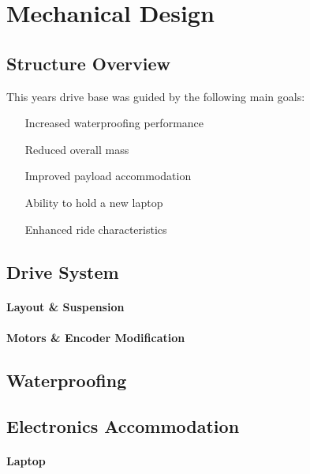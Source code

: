 \section{Mechanical Design}

\subsection{Structure Overview}
This years drive base was guided by the following main goals:

\begin{itemize}
\item[Increased waterproofing performance]
\item[Reduced overall mass]
\item[Improved payload accommodation]
\item[Ability to hold a new laptop]
\item[Enhanced ride characteristics]
\end{itemize}

\subsection{Drive System}
\paragraph{Layout \& Suspension}

\paragraph{Motors \& Encoder Modification}

\subsection{Waterproofing}

\subsection{Electronics Accommodation}
\paragraph{Laptop}

